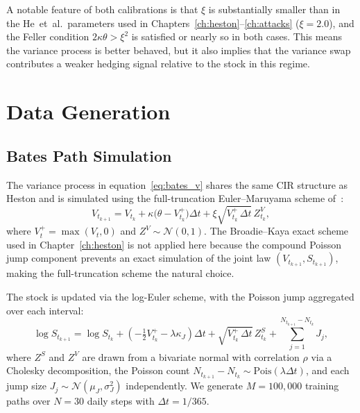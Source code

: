 A notable feature of both calibrations is that $\xi$ is substantially
smaller than in the He~et~al.\ parameters used in
Chapters~\ref{ch:heston}--\ref{ch:attacks} ($\xi = 2.0$), and the
Feller condition $2\kappa\theta > \xi^2$ is satisfied or nearly so in
both cases.  This means the variance process is better behaved, but it
also implies that the variance swap contributes a weaker hedging signal
relative to the stock in this regime.

\section{Data Generation}
\label{sec:bates_data}

\subsection{Bates Path Simulation}
\label{sec:bates_sim}

The variance process in equation~\eqref{eq:bates_v} shares the same
CIR structure as Heston and is simulated using the full-truncation
Euler--Maruyama scheme of~\citet{lord2010comparison}:
\begin{equation}
  V_{t_{k+1}} = V_{t_k}
    + \kappa\bigl(\theta - V_{t_k}^+\bigr)\Delta t
    + \xi\sqrt{V_{t_k}^+\,\Delta t}\,Z_{t_k}^V,
  \label{eq:bates_v_euler}
\end{equation}
where $V_t^+ = \max(V_t, 0)$ and $Z^V \sim \mathcal{N}(0,1)$.  The
Broadie--Kaya exact scheme used in Chapter~\ref{ch:heston} is not
applied here because the compound Poisson jump component prevents an
exact simulation of the joint law $(V_{t_{k+1}}, S_{t_{k+1}})$, making
the full-truncation scheme the natural choice.

The stock is updated via the log-Euler scheme, with the Poisson jump
aggregated over each interval:
\begin{equation}
  \log S_{t_{k+1}} = \log S_{t_k}
    + \left(-\tfrac{1}{2}V_{t_k}^+ - \lambda\kappa_J\right)\Delta t
    + \sqrt{V_{t_k}^+\,\Delta t}\,Z_{t_k}^S
    + \sum_{j=1}^{N_{t_{k+1}} - N_{t_k}} J_j,
  \label{eq:bates_s_euler}
\end{equation}
where $Z^S$ and $Z^V$ are drawn from a bivariate normal with correlation
$\rho$ via a Cholesky decomposition, the Poisson count
$N_{t_{k+1}} - N_{t_k} \sim \mathrm{Pois}(\lambda\Delta t)$, and each
jump size $J_j \sim \mathcal{N}(\mu_J, \sigma_J^2)$ independently.  We
generate $M = 100{,}000$ training paths over $N = 30$ daily steps with
$\Delta t = 1/365$.

